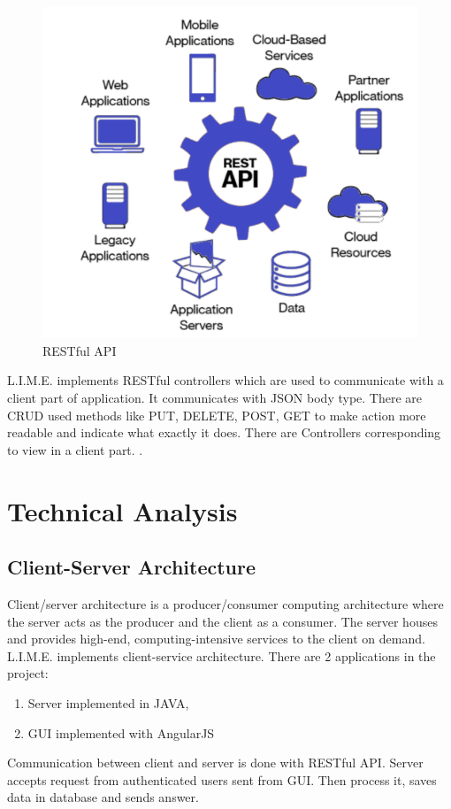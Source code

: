 \documentclass[a4paper,11pt,twoside]{report}
\theoremstyle{definition}
\begin{document}
\begin{figure}[h!]

\begin{center}

\includegraphics[width=\textwidth]{rest}

\end{center}
\caption{RESTful API}
\end{figure}
 
L.I.M.E. implements RESTful controllers which are used to communicate with a client part of application. It communicates with JSON body type. There are CRUD used methods like PUT, DELETE, POST, GET to make action more readable and indicate what exactly it does. There are Controllers corresponding to view in a client part. .




\chapter{Technical Analysis}


\section{Client-Server Architecture}

Client/server architecture is a producer/consumer computing architecture where the server acts as the producer and the client as a consumer. The server houses and provides high-end, computing-intensive services to the client on demand.
L.I.M.E. implements client-service architecture. There are 2 applications in the project:
\begin{enumerate}
\item Server implemented in JAVA,
\item GUI implemented with AngularJS
\end{enumerate}
Communication between client and server is done with RESTful API. Server accepts request from authenticated users sent from GUI. Then process it, saves data in database and sends answer.
\end{document}

